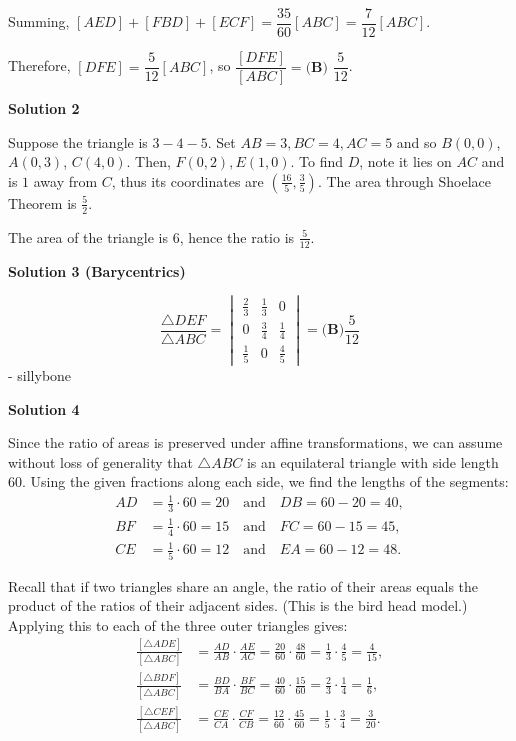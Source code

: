 \begin{enumerate}
 Summing, $[AED] + [FBD] + [ECF] = \dfrac{35}{60}[ABC] = \dfrac{7}{12}[ABC]$.

 Therefore, $[DFE] = \dfrac{5}{12}[ABC]$, so $\dfrac{[DFE]}{[ABC]} = \boxed{\textbf{(B) } \dfrac{5}{12}}$.

 



\textbf{Solution 2}

Suppose the triangle is $3-4-5$. Set $AB = 3, BC = 4, AC = 5$ and so $B(0,0)$, $A(0,3)$, $C(4,0)$. Then, $F(0,2), E(1,0)$. To find $D$, note it lies on $AC$ and is $1$ away from $C$, thus its coordinates are $(\frac{16}{5}, \frac{3}{5})$. The area through Shoelace Theorem is $\frac{5}{2}$. 

 The area of the triangle is 6, hence the ratio is $\boxed{\frac{5}{12}}$.

 



\textbf{Solution 3 (Barycentrics)}


 \[\frac{\triangle DEF}{\triangle ABC} =  \begin{vmatrix} \frac{2}{3} & \frac{1}{3} & 0 \\ 0 & \frac{3}{4} & \frac{1}{4} \\  \frac{1}{5} & 0 & \frac{4}{5}  \end{vmatrix} = \boxed{ \textbf{(B)}\frac{5}{12}}\]- sillybone

 



\textbf{Solution 4}

Since the ratio of areas is preserved under affine transformations, we can assume without loss of generality that $\triangle ABC$ is an equilateral triangle with side length $60$. Using the given fractions along each side, we find the lengths of the segments:
 \begin{align*} AD &= \frac{1}{3} \cdot 60 = 20 \quad \text{and} \quad DB = 60 - 20 = 40, \\ BF &= \frac{1}{4} \cdot 60 = 15 \quad \text{and} \quad FC = 60 - 15 = 45, \\ CE &= \frac{1}{5} \cdot 60 = 12 \quad \text{and} \quad EA = 60 - 12 = 48. \end{align*}


 Recall that if two triangles share an angle, the ratio of their areas equals the product of the ratios of their adjacent sides. (This is the bird head model.) Applying this to each of the three outer triangles gives:
 \begin{align*} \frac{[\triangle ADE]}{[\triangle ABC]} &= \frac{AD}{AB} \cdot \frac{AE}{AC} = \frac{20}{60} \cdot \frac{48}{60} = \frac{1}{3} \cdot \frac{4}{5} = \frac{4}{15}, \\ \frac{[\triangle BDF]}{[\triangle ABC]} &= \frac{BD}{BA} \cdot \frac{BF}{BC} = \frac{40}{60} \cdot \frac{15}{60} = \frac{2}{3} \cdot \frac{1}{4} = \frac{1}{6}, \\ \frac{[\triangle CEF]}{[\triangle ABC]} &= \frac{CE}{CA} \cdot \frac{CF}{CB} = \frac{12}{60} \cdot \frac{45}{60} = \frac{1}{5} \cdot \frac{3}{4} = \frac{3}{20}. \end{align*}



\end{enumerate}

